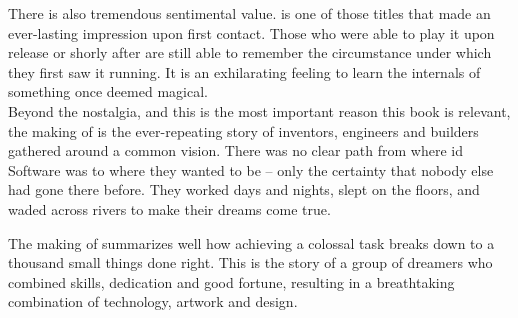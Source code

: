  \par

There is also tremendous sentimental value. \doom{} is one of those titles that made an ever-lasting impression upon first contact. Those who were able to play it upon release or shorly after are still able to remember the circumstance under which they first saw it running. It is an exhilarating feeling to learn the internals of something once deemed magical.\\


Beyond the nostalgia, and this is the most important reason this book is relevant, the making of \doom{} is the ever-repeating story of inventors, engineers and builders gathered around a common vision. There was no clear path from where id Software was to where they wanted to be -- only the certainty that nobody else had gone there before. They worked days and nights, slept on the floors, and waded across rivers to make their dreams come true.\\
\par
 The making of \doom{} summarizes well how achieving a colossal task breaks down to a thousand small things done right. This is the story of a group of dreamers who combined skills, dedication and good fortune, resulting in a breathtaking combination of technology, artwork and design.\\
\par



